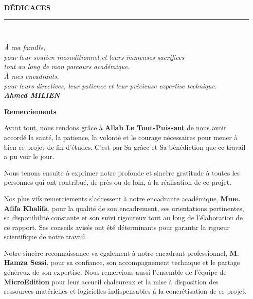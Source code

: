 \documentclass[a4paper,12pt,twoside]{report}
\begin{document}
\clearpage
\thispagestyle{preStyle}
\null\vspace*{\fill}
\begin{center}
  {\fontsize{26}{30}\selectfont\bfseries DÉDICACES}\\[1cm]
  \rule{0.5\textwidth}{0.5pt}\\[1.5cm]
\end{center}
\begin{flushright}
  \itshape
  À ma famille,\\
  pour leur soutien inconditionnel et leurs immenses sacrifices\\
  tout au long de mon parcours académique.\\[0.5cm]
  
  À mes encadrants,\\
  pour leurs directives, leur patience et leur précieuse expertise technique.\\[0.5cm]
  
  \textbf{\Large Ahmed MILIEN}
\end{flushright}
\vspace*{\fill}

\clearpage
\thispagestyle{preStyle}
\begin{center}
  {\fontsize{16}{20}\selectfont\bfseries Remerciements}
\end{center}
\noindent
Avant tout, nous rendons grâce à \textbf{Allah Le Tout-Puissant} de nous avoir accordé la santé, la patience, la volonté et le courage nécessaires pour mener à bien ce projet de fin d'études. C'est par Sa grâce et Sa bénédiction que ce travail a pu voir le jour.

\noindent
Nous tenons ensuite à exprimer notre profonde et sincère gratitude à toutes les personnes qui ont contribué, de près ou de loin, à la réalisation de ce projet.

\noindent
Nos plus vifs remerciements s'adressent à notre encadrante académique, \textbf{Mme. Afifa Khalifa}, pour la qualité de son encadrement, ses orientations pertinentes, sa disponibilité constante et son suivi rigoureux tout au long de l'élaboration de ce rapport. Ses conseils avisés ont été déterminants pour garantir la rigueur scientifique de notre travail.

\noindent
Notre sincère reconnaissance va également à notre encadrant professionnel, \textbf{M. Hamza Sessi}, pour sa confiance, son accompagnement technique et le partage généreux de son expertise. Nous remercions aussi l'ensemble de l'équipe de \textbf{MicroEdition} pour leur accueil chaleureux et la mise à disposition des ressources matérielles et logicielles indispensables à la concrétisation de ce projet.
\end{document}
